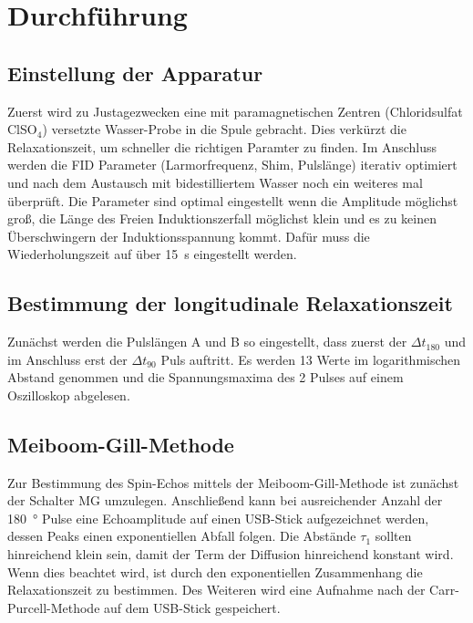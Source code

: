 \section{Durchführung}%
\label{sec:durchfuehrung}

\subsection{Einstellung der Apparatur}%
\label{sub:einstellung_der_apparatur}

Zuerst wird zu Justagezwecken eine mit paramagnetischen Zentren (Chloridsulfat
ClSO$_4$) versetzte Wasser-Probe in die Spule gebracht.
Dies verkürzt die Relaxationszeit, um schneller die richtigen Paramter zu finden.
Im Anschluss werden die FID Parameter (Larmorfrequenz, Shim, Pulslänge) iterativ optimiert und nach dem Austausch
mit bidestilliertem Wasser noch ein weiteres mal überprüft.
Die Parameter sind optimal eingestellt wenn die Amplitude möglichst groß, die
Länge des Freien Induktionszerfall möglichst klein und es zu keinen
Überschwingern der Induktionsspannung kommt.
Dafür muss die Wiederholungszeit auf über \SI{15}{\second} eingestellt werden.

\subsection{Bestimmung der longitudinale Relaxationszeit}%
\label{sub:bestimmung_der_longitudinale_relaxationszeit}
Zunächst werden die Pulslängen A und B so eingestellt, dass zuerst der
$\Delta t_{180}$ und im Anschluss erst der $\Delta t_{90}$ Puls auftritt.
Es werden 13 Werte im logarithmischen Abstand genommen und die
Spannungsmaxima des 2 Pulses auf einem Oszilloskop abgelesen.

\subsection{Meiboom-Gill-Methode}%
\label{sub:meiboom_gill_methode}
Zur Bestimmung des Spin-Echos mittels der Meiboom-Gill-Methode ist zunächst der
Schalter MG umzulegen. Anschließend kann bei ausreichender Anzahl der \SI{180}{\degree}
Pulse eine Echoamplitude auf einen USB-Stick aufgezeichnet werden, dessen Peaks einen
exponentiellen Abfall folgen.
Die Abstände $\tau_1$ sollten hinreichend klein sein, damit der Term der
Diffusion hinreichend konstant wird.
Wenn dies beachtet wird, ist durch den exponentiellen Zusammenhang die
Relaxationszeit zu bestimmen.
Des Weiteren wird eine Aufnahme nach der Carr-Purcell-Methode auf
dem USB-Stick gespeichert.

